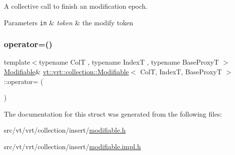 A collective call to finish an modification epoch. 


\begin{DoxyParams}[1]{Parameters}
\mbox{\tt in}  & {\em token} & the modify token \\
\hline
\end{DoxyParams}
\mbox{\label{structvt_1_1vrt_1_1collection_1_1_modifiable_a4eaeef4b3bc127d86fa9014361fb587d}} 
\subsubsection{\texorpdfstring{operator=()}{operator=()}}
{\footnotesize\ttfamily template$<$typename ColT , typename IndexT , typename Base\+ProxyT $>$ \\
\hyperlink{structvt_1_1vrt_1_1collection_1_1_modifiable}{Modifiable}\& \hyperlink{structvt_1_1vrt_1_1collection_1_1_modifiable}{vt\+::vrt\+::collection\+::\+Modifiable}$<$ ColT, IndexT, Base\+ProxyT $>$\+::operator= (\begin{DoxyParamCaption}\item[{\hyperlink{structvt_1_1vrt_1_1collection_1_1_modifiable}{Modifiable}$<$ ColT, IndexT, Base\+ProxyT $>$ const \&}]{ }\end{DoxyParamCaption})\hspace{0.3cm}{\ttfamily [default]}}



The documentation for this struct was generated from the following files\+:\begin{DoxyCompactItemize}
\item 
src/vt/vrt/collection/insert/\hyperlink{modifiable_8h}{modifiable.\+h}\item 
src/vt/vrt/collection/insert/\hyperlink{modifiable_8impl_8h}{modifiable.\+impl.\+h}\end{DoxyCompactItemize}
